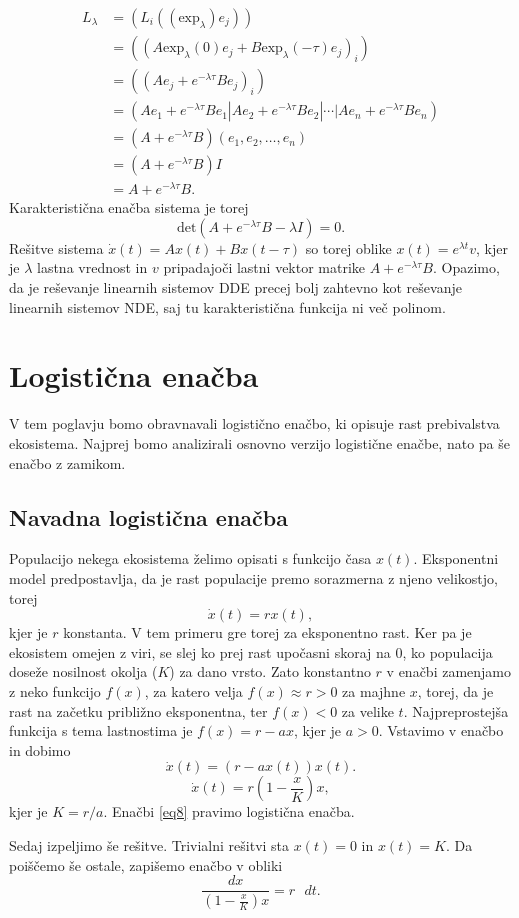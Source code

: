 \documentclass[12pt,a4paper]{amsart}
\theoremstyle{definition} %
\theoremstyle{plain} %
\newcommand{\okr}{\text{exp}_{\lambda}}
\begin{document}
\begin{equation*}
    \begin{split}
        L_\lambda &= (L_i((\okr)e_j)) \\
                &= ((A\okr(0)e_j+B\okr(-\tau)e_j)_i) \\
                &= ((Ae_j+e^{-\lambda\tau}Be_j)_i) \\
                &= (Ae_1+e^{-\lambda\tau}Be_1|Ae_2+e^{-\lambda\tau}Be_2|\cdots|Ae_n+e^{-\lambda\tau}Be_n) \\
                &= (A+e^{-\lambda\tau}B)(e_1,e_2,\dots,e_n) \\
                &= (A+e^{-\lambda\tau}B)I \\
                &= A+e^{-\lambda\tau}B.
    \end{split}
\end{equation*}
Karakteristična enačba sistema je torej
\[\text{det}(A+e^{-\lambda\tau}B-\lambda I)=0.\]
Rešitve sistema $\dot{x}(t)=Ax(t)+Bx(t-\tau)$ so torej oblike $x(t)=e^{\lambda t}v$, kjer je $\lambda$ lastna vrednost in $v$ pripadajoči lastni 
vektor matrike $A+e^{-\lambda\tau}B$. Opazimo, da je reševanje linearnih sistemov DDE precej bolj zahtevno kot
reševanje linearnih sistemov NDE, saj tu karakteristična funkcija ni več polinom.

\section{Logistična enačba}
V tem poglavju bomo obravnavali logistično enačbo, ki opisuje rast prebivalstva ekosistema. Najprej bomo analizirali 
osnovno verzijo logistične enačbe, nato pa še enačbo z zamikom.

\subsection{Navadna logistična enačba}
Populacijo nekega ekosistema želimo opisati s funkcijo časa $x(t)$. Eksponentni model predpostavlja, da je rast 
populacije premo sorazmerna z njeno velikostjo, torej
\[\dot{x}(t)=rx(t), \]
kjer je $r$ konstanta. V tem primeru gre torej za eksponentno rast. Ker pa je ekosistem omejen z viri, se slej ko 
prej rast upočasni skoraj na 0, ko populacija doseže nosilnost okolja ($K$) za dano vrsto. Zato konstantno $r$ v 
enačbi zamenjamo z neko funkcijo $f(x)$, za katero velja $f(x)\approx r>0$ za majhne $x$, torej, da je rast na začetku 
približno eksponentna, ter $f(x)<0$ za velike $t$. Najpreprostejša funkcija s tema lastnostima je $f(x)=r-ax$, 
kjer je $a>0$. Vstavimo v enačbo in dobimo
\[\dot{x}(t)=(r-ax(t))x(t).\]
\begin{equation} \label{eq8}
    \dot{x}(t) = r(1-\frac{x}{K})x,
\end{equation}
kjer je $K=r/a$. Enačbi \eqref{eq8} pravimo logistična enačba.

Sedaj izpeljimo še rešitve. Trivialni rešitvi sta $x(t)=0$ in $x(t)=K$. Da poiščemo še ostale, zapišemo enačbo v obliki
\[\frac{dx}{(1-\frac{x}{K})x}=r\text{ }dt.\]


\newpage
\overfullrule=0mm\printbibliography
\end{document}
